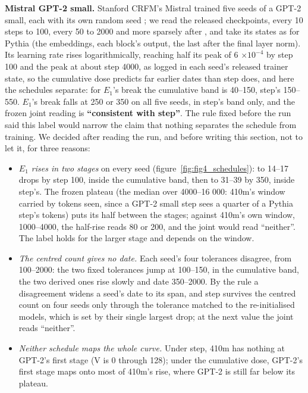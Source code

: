 \documentclass[11pt]{article}
\begin{document}
\textbf{Mistral GPT-2 small.} Stanford CRFM's Mistral trained five seeds of a GPT-2 small, each with its own random seed \citep{karamcheti2021}; we read the released checkpoints, every 10 steps to 100, every 50 to 2000 and more sparsely after \citep{crfm}, and take its states as for Pythia (the embeddings, each block's output, the last after the final layer norm). Its learning rate rises logarithmically, reaching half its peak of 6 $\times 10^{-4}$ by step 100 and the peak at about step 4000, as logged in each seed's released trainer state, so the cumulative dose predicts far earlier dates than step does, and here the schedules separate: for $E_{1}$'s break the cumulative band is 40--150, step's 150--550. $E_{1}$'s break falls at 250 or 350 on all five seeds, in step's band only, and the frozen joint reading is \textbf{``consistent with step''}. The rule fixed before the run said this label would narrow the claim that nothing separates the schedule from training. We decided after reading the run, and before writing this section, not to let it, for three reasons:

\begin{itemize}
  \item \emph{$E_{1}$ rises in two stages} on every seed (figure~\ref{fig:fig4_schedules}): to 14--17 drops by step 100, inside the cumulative band, then to 31--39 by 350, inside step's. The frozen plateau (the median over 4000--16 000: 410m's window carried by tokens seen, since a GPT-2 small step sees a quarter of a Pythia step's tokens) puts its half between the stages; against 410m's own window, 1000--4000, the half-rise reads 80 or 200, and the joint would read ``neither''. The label holds for the larger stage and depends on the window.
  \item \emph{The centred count gives no date.} Each seed's four tolerances disagree, from 100--2000: the two fixed tolerances jump at 100--150, in the cumulative band, the two derived ones rise slowly and date 350--2000. By the rule a disagreement widens a seed's date to its span, and step survives the centred count on four seeds only through the tolerance matched to the re-initialised models, which is set by their single largest drop; at the next value the joint reads ``neither''.
  \item \emph{Neither schedule maps the whole curve.} Under step, 410m has nothing at GPT-2's first stage (V is 0 through 128); under the cumulative dose, GPT-2's first stage maps onto most of 410m's rise, where GPT-2 is still far below its plateau.
\end{itemize}
\end{document}
